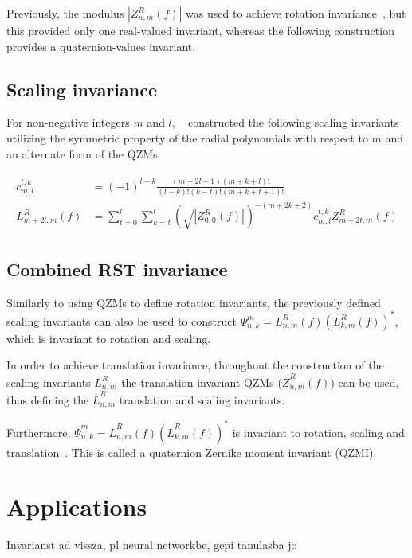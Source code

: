 Previously, the modulus $|Z_{n,m}^R(f)|$ was used to achieve rotation invariance~\cite{qzm}, but this provided only one real-valued invariant, whereas the following construction provides a quaternion-values invariant.

\subsection{Scaling invariance}
For non-negative integers $m$ and $l$, \citeauthor{qzmi}~\cite{qzmi} constructed the following scaling invariants utilizing the symmetric property of the radial polynomials with respect to $m$ and an alternate form of the QZMs.

\begin{gather*}
  \begin{split}
  c_{m,l}^{t,k} &= (-1)^{l-k}\frac{(m + 2l + 1)(m + k + l)!}{(l - k)!(k - t)!(m + k + t + 1)!} \\
  L_{m + 2l,m}^R(f) &= \sum_{t=0}^l\sum_{k=t}^l\left(\sqrt{|Z_{0,0}^R(f)|}\right)^{-(m+2k+2)}c_{m,l}^{t,k}Z_{m+2t,m}^R(f)
  \end{split}
\end{gather*}

\subsection{Combined RST invariance}
Similarly to using QZMs to define rotation invariants, the previously defined scaling invariants can also be used to construct $\Psi_{n,k}^m = L_{n,m}^R(f)(L_{k,m}^R(f))^*$, which is invariant to rotation and scaling.

In order to achieve translation invariance, throughout the construction of the scaling invariants $L_{n,m}^R$ the translation invariant QZMs ($\overline{Z}_{n,m}^R(f)$) can be used, thus defining the $\overline{L}_{n,m}^R$ translation and scaling invariants.

Furthermore, $\overline{\Psi}_{n,k}^m = \overline{L}_{n,m}^R(f)(\overline{L}_{k,m}^R(f))^*$ is invariant to rotation, scaling and translation~\cite{qzmi}. This is called a quaternion Zernike moment invariant (QZMI).

\section{Applications}
Invarianst ad vissza, pl neural networkbe, gepi tanulasba jo